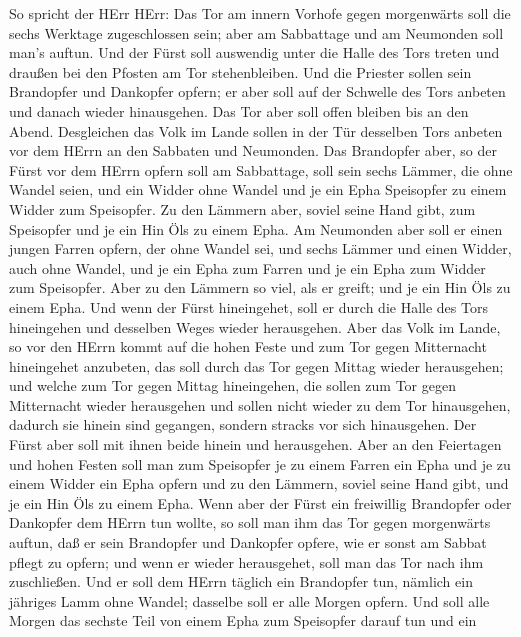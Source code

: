  So spricht der HErr HErr: Das Tor am innern Vorhofe gegen
morgenwärts soll die sechs Werktage zugeschlossen sein; aber am
Sabbattage und am Neumonden soll man's auftun.  Und der
Fürst soll auswendig unter die Halle des Tors treten und draußen bei den
Pfosten am Tor stehenbleiben. Und die Priester sollen sein Brandopfer
und Dankopfer opfern; er aber soll auf der Schwelle des Tors anbeten und
danach wieder hinausgehen. Das Tor aber soll offen bleiben bis an den
Abend.  Desgleichen das Volk im Lande sollen in der Tür
desselben Tors anbeten vor dem HErrn an den Sabbaten und Neumonden.
 Das Brandopfer aber, so der Fürst vor dem HErrn opfern soll
am Sabbattage, soll sein sechs Lämmer, die ohne Wandel seien, und ein
Widder ohne Wandel  und je ein Epha Speisopfer zu einem
Widder zum Speisopfer. Zu den Lämmern aber, soviel seine Hand gibt, zum
Speisopfer und je ein Hin Öls zu einem Epha.  Am Neumonden
aber soll er einen jungen Farren opfern, der ohne Wandel sei, und sechs
Lämmer und einen Widder, auch ohne Wandel,  und je ein Epha
zum Farren und je ein Epha zum Widder zum Speisopfer. Aber zu den
Lämmern so viel, als er greift; und je ein Hin Öls zu einem Epha.
 Und wenn der Fürst hineingehet, soll er durch die Halle des
Tors hineingehen und desselben Weges wieder herausgehen. 
Aber das Volk im Lande, so vor den HErrn kommt auf die hohen Feste und
zum Tor gegen Mitternacht hineingehet anzubeten, das soll durch das Tor
gegen Mittag wieder herausgehen; und welche zum Tor gegen Mittag
hineingehen, die sollen zum Tor gegen Mitternacht wieder herausgehen und
sollen nicht wieder zu dem Tor hinausgehen, dadurch sie hinein sind
gegangen, sondern stracks vor sich hinausgehen.  Der Fürst
aber soll mit ihnen beide hinein und herausgehen.  Aber an
den Feiertagen und hohen Festen soll man zum Speisopfer je zu einem
Farren ein Epha und je zu einem Widder ein Epha opfern und zu den
Lämmern, soviel seine Hand gibt, und je ein Hin Öls zu einem Epha.
 Wenn aber der Fürst ein freiwillig Brandopfer oder
Dankopfer dem HErrn tun wollte, so soll man ihm das Tor gegen
morgenwärts auftun, daß er sein Brandopfer und Dankopfer opfere, wie er
sonst am Sabbat pflegt zu opfern; und wenn er wieder herausgehet, soll
man das Tor nach ihm zuschließen.  Und er soll dem HErrn
täglich ein Brandopfer tun, nämlich ein jähriges Lamm ohne Wandel;
dasselbe soll er alle Morgen opfern.  Und soll alle Morgen
das sechste Teil von einem Epha zum Speisopfer darauf tun und ein
